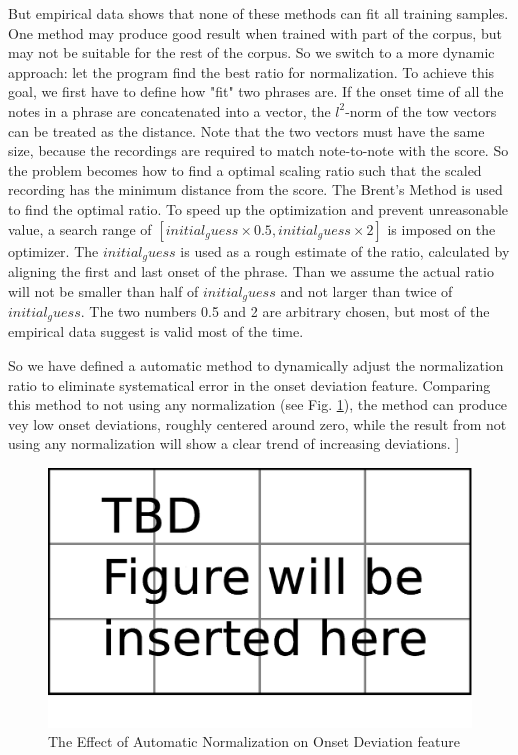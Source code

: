    But empirical data shows that none of these methods can fit all training samples. One method may produce good result when trained with part of the corpus, but may not be suitable for the rest of the corpus. So we switch to a more dynamic approach: let the program find the best ratio for normalization. To achieve this goal, we first have to define how "fit" two phrases are. If the onset time of all the notes in a phrase are concatenated into a vector, the $l^2$-norm of the tow vectors can be treated as the distance. Note that the two vectors must have the same size, because the recordings are required to match note-to-note with the score. So the problem becomes how to find a optimal scaling ratio such that the scaled recording has the minimum distance from the score. The Brent's Method\cite{brent1973} is used to find the optimal ratio. To speed up the optimization and prevent unreasonable value, a search range of $[initial_guess \times 0.5 , initial_guess \times 2]$ is imposed on the optimizer. The $initial_guess$ is used as a rough estimate of the ratio, calculated by aligning the first and last onset of the phrase. Than we assume the actual ratio will not be smaller than half of $initial_guess$ and not larger than twice of $initial_guess$. The two numbers 0.5 and 2 are arbitrary chosen, but most of the empirical data suggest is valid most of the time. 

   So we have defined a automatic method to dynamically adjust the normalization ratio to eliminate systematical error in the onset deviation feature. Comparing this method to not using any normalization (see Fig. \ref{fig:afternorm}), the method can produce vey low onset deviations, roughly centered around zero, while the result from not using any normalization will show a clear trend of increasing deviations.
]
\begin{figure}[tp]
   \begin{center}
      \includegraphics[width=\textwidth]{fig/TBDFigure}

   \end{center}
   \caption{The Effect of Automatic Normalization on Onset Deviation feature}
   \label{fig:afternorm}
\end{figure}


